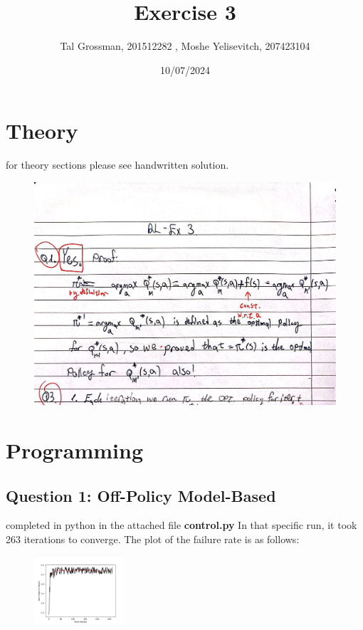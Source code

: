 \documentclass{assignmeownt}
\title{Exercise 3}
\author{Tal Grossman, 201512282 , Moshe Yelisevitch, 207423104}
\date{10/07/2024}
\begin{document}
\maketitle
\thispagestyle{firststyle}
\section{Theory}
for theory sections please see handwritten solution.

\begin{figure}[h]
    \centering
    \includegraphics[width=\textwidth]{HW3_solution_Q1.jpg}
\end{figure}




\newpage
\section{Programming}

\subsection{Question 1: Off-Policy Model-Based}
completed in python in the attached file \textbf{control.py}
\newline
In that specific run, it took 263 iterations to converge. The plot of the failure rate is as follows:
\begin{figure}[H]
    \centering
    \includegraphics[width=0.3\textwidth]{ex1_263_failure_plot.png}
\end{figure}
\end{document}
